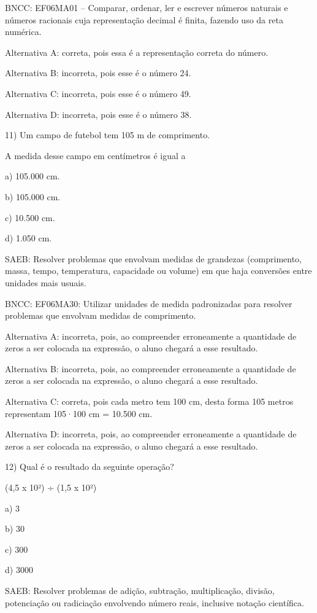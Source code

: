 BNCC: EF06MA01 -- Comparar, ordenar, ler e escrever números naturais e
números racionais cuja representação decimal é finita, fazendo uso da
reta numérica.

Alternativa A: correta, pois essa é a representação correta do número.

Alternativa B: incorreta, pois esse é o número 24.

Alternativa C: incorreta, pois esse é o número 49.

Alternativa D: incorreta, pois esse é o número 38.

11) Um campo de futebol tem 105 m de comprimento.

A medida desse campo em centímetros é igual a

a) 105.000 cm.

b) 105.000 cm.

c) 10.500 cm.

d) 1.050 cm.

SAEB: Resolver problemas que envolvam medidas de grandezas (comprimento,
massa, tempo, temperatura, capacidade ou volume) em que haja conversões
entre unidades mais usuais.

BNCC: EF06MA30: Utilizar unidades de medida padronizadas para resolver
problemas que envolvam medidas de comprimento.

Alternativa A: incorreta, pois, ao compreender erroneamente a quantidade
de zeros a ser colocada na expressão, o aluno chegará a esse resultado.

Alternativa B: incorreta, pois, ao compreender erroneamente a quantidade
de zeros a ser colocada na expressão, o aluno chegará a esse resultado.

Alternativa C: correta, pois cada metro tem 100 cm, desta forma 105
metros representam 105·100 cm = 10.500 cm.

Alternativa D: incorreta, pois, ao compreender erroneamente a quantidade
de zeros a ser colocada na expressão, o aluno chegará a esse resultado.

12) Qual é o resultado da seguinte operação?

(4,5 x 10²) ÷ (1,5 x 10²)

a) 3

b) 30

c) 300

d) 3000

SAEB: Resolver problemas de adição, subtração, multiplicação, divisão,
potenciação ou radiciação envolvendo número reais, inclusive notação
científica.

